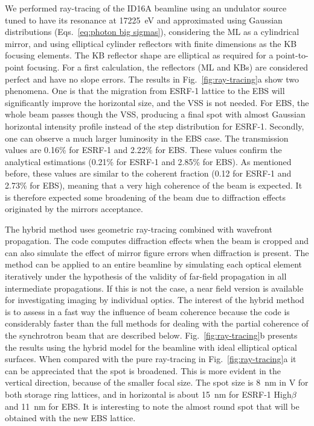 \documentclass{iucr}              %
\begin{document}
We performed ray-tracing of the ID16A beamline using an undulator source tuned to have its resonance at 17225~eV and approximated using Gaussian distributions (Eqs.~\ref{eq:photon big sigmas}), considering the ML as a cylindrical mirror, and using elliptical cylinder reflectors with finite dimensions as the KB focusing elements. The KB reflector shape are elliptical as required for a point-to-point focusing. For a first calculation, the reflectors (ML and KBs) are considered perfect and have no slope errors. 
The results in Fig.~\ref{fig:ray-tracing}a show two phenomena. One is that the migration from ESRF-1 lattice to the EBS will significantly improve the horizontal size, and the VSS is not needed. For EBS, the whole beam passes though the VSS, producing a final spot with almost Gaussian horizontal intensity profile instead of the step distribution for ESRF-1. Secondly, one can observe a much larger luminosity in the EBS case. The transmission values are 0.16\% for ESRF-1 and 2.22\% for EBS. These values confirm the analytical estimations (0.21\% for ESRF-1 and 2.85\% for EBS). As mentioned before, these values are similar to the coherent fraction \cite{arxivCF} (0.12 for ESRF-1 and 2.73\% for EBS), meaning that a very high coherence of the beam is expected. It is therefore expected some broadening of the beam due to diffraction effects originated by the mirrors acceptance. 

The hybrid method \cite{hybrid} uses geometric ray-tracing combined with wavefront propagation. The code computes diffraction effects when the beam is cropped and can also simulate the effect of mirror figure errors when diffraction is present. The method can be applied to an entire beamline by simulating each optical element iteratively under the hypothesis of the validity of far-field propagation in all intermediate propagations. If this is not the case, a near field version is available for investigating imaging by individual optics. The interest of the hybrid method is to assess in a fast way the influence of beam coherence because the code is considerably faster than the full methods for dealing with the partial coherence of the synchrotron beam that are described below. Fig.~\ref{fig:ray-tracing}b presents the results using the hybrid model for the beamline with ideal elliptical optical surfaces. When compared with the pure ray-tracing in Fig.~\ref{fig:ray-tracing}a it can be appreciated that the spot is broadened. This is more evident in the vertical direction, because of the smaller focal size. The spot size is 8~nm in V for both storage ring lattices, and in horizontal is about 15~nm for ESRF-1 High$\beta$ and 11~nm for EBS. It is interesting to note the almost round spot that will be obtained with the new EBS lattice. 
\end{document}
